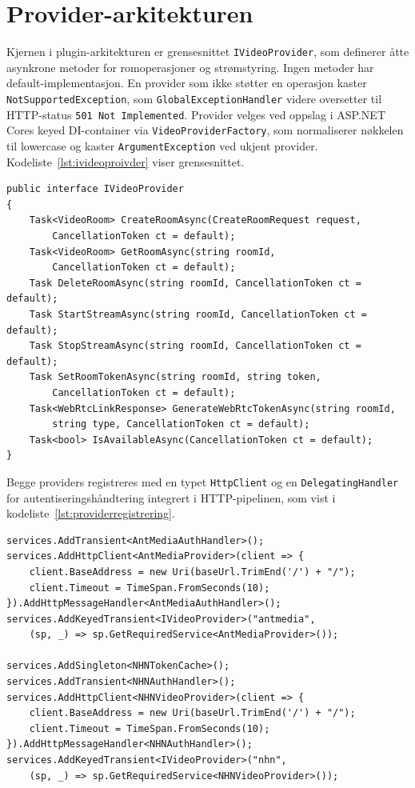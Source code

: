 \section{Provider-arkitekturen}
\label{sec:providers}

Kjernen i plugin-arkitekturen er grensesnittet \texttt{IVideoProvider},
som definerer åtte asynkrone metoder for romoperasjoner og
strømstyring. Ingen metoder har default-implementasjon. En provider som
ikke støtter en operasjon kaster \texttt{NotSupportedException}, som
\texttt{GlobalExceptionHandler} videre oversetter til HTTP-status \texttt{501 Not Implemented}. Provider velges
ved oppslag i ASP.NET Cores keyed DI-container via
\texttt{VideoProviderFactory}, som normaliserer nøkkelen til lowercase og
kaster \texttt{ArgumentException} ved ukjent provider.
Kodeliste~\ref{lst:ivideoproivder} viser grensesnittet.

\begin{lstlisting}[language={[Sharp]C}, label=lst:ivideoproivder,
  caption={IVideoProvider-grensesnittet.}]
public interface IVideoProvider
{
    Task<VideoRoom> CreateRoomAsync(CreateRoomRequest request,
        CancellationToken ct = default);
    Task<VideoRoom> GetRoomAsync(string roomId,
        CancellationToken ct = default);
    Task DeleteRoomAsync(string roomId, CancellationToken ct = default);
    Task StartStreamAsync(string roomId, CancellationToken ct = default);
    Task StopStreamAsync(string roomId, CancellationToken ct = default);
    Task SetRoomTokenAsync(string roomId, string token,
        CancellationToken ct = default);
    Task<WebRtcLinkResponse> GenerateWebRtcTokenAsync(string roomId,
        string type, CancellationToken ct = default);
    Task<bool> IsAvailableAsync(CancellationToken ct = default);
}
\end{lstlisting}

Begge providers registreres med en typet \texttt{HttpClient} og en
\texttt{DelegatingHandler} for autentiseringshåndtering integrert i HTTP-pipelinen,
som vist i kodeliste~\ref{lst:providerregistrering}.

\begin{lstlisting}[language={[Sharp]C}, label=lst:providerregistrering,
  caption={Registrering av providers som keyed services.}]
services.AddTransient<AntMediaAuthHandler>();
services.AddHttpClient<AntMediaProvider>(client => {
    client.BaseAddress = new Uri(baseUrl.TrimEnd('/') + "/");
    client.Timeout = TimeSpan.FromSeconds(10);
}).AddHttpMessageHandler<AntMediaAuthHandler>();
services.AddKeyedTransient<IVideoProvider>("antmedia",
    (sp, _) => sp.GetRequiredService<AntMediaProvider>());

services.AddSingleton<NHNTokenCache>();
services.AddTransient<NHNAuthHandler>();
services.AddHttpClient<NHNVideoProvider>(client => {
    client.BaseAddress = new Uri(baseUrl.TrimEnd('/') + "/");
    client.Timeout = TimeSpan.FromSeconds(10);
}).AddHttpMessageHandler<NHNAuthHandler>();
services.AddKeyedTransient<IVideoProvider>("nhn",
    (sp, _) => sp.GetRequiredService<NHNVideoProvider>());
\end{lstlisting}

